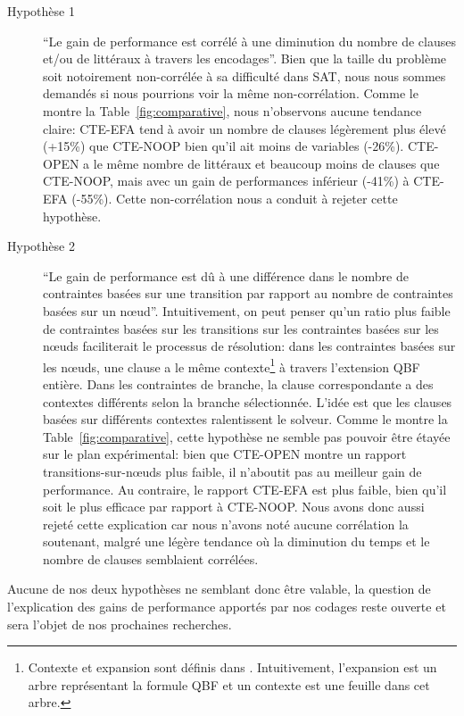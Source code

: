 \begin{description}
\item[Hypothèse 1] ``Le gain de performance est corrélé à une diminution du nombre de clauses et/ou de littéraux à travers les encodages''. Bien que la taille du problème soit notoirement non-corrélée à sa difficulté dans SAT, nous nous sommes demandés si nous pourrions voir la même non-corrélation. Comme le montre la Table~\ref{fig:comparative}, nous n'observons aucune tendance claire: CTE-EFA tend à avoir un nombre de clauses légèrement plus élevé (+15\%) que CTE-NOOP bien qu'il ait moins de variables (-26\%). CTE-OPEN a le même nombre de littéraux et beaucoup moins de clauses que CTE-NOOP, mais avec un gain de performances inférieur (-41\%) à CTE-EFA (-55\%). Cette non-corrélation nous a conduit à rejeter cette hypothèse.
~\\

\item[Hypothèse 2] ``Le gain de performance est dû à une différence dans le nombre de contraintes basées sur une transition par rapport au nombre de contraintes basées sur un n\oe ud''. Intuitivement, on peut penser qu'un ratio plus faible de contraintes basées sur les transitions sur les contraintes basées sur les n\oe uds faciliterait le processus de résolution: dans les contraintes basées sur les n\oe uds, une clause a le même contexte\footnote {Contexte et expansion sont définis dans \cite{DBLP:conf/ecai/CashmoreFG12}. Intuitivement, l'expansion est un arbre représentant la formule QBF et un contexte est une feuille dans cet arbre.} à travers l'extension QBF entière. Dans les contraintes de branche, la clause correspondante a des contextes différents selon la branche sélectionnée. L'idée est que les clauses basées sur différents contextes ralentissent le solveur. Comme le montre la Table~\ref{fig:comparative}, cette hypothèse ne semble pas pouvoir être étayée sur le plan expérimental: bien que CTE-OPEN montre un rapport transitions-sur-n\oe uds plus faible, il n'aboutit pas au meilleur gain de performance. Au contraire, le rapport CTE-EFA est plus faible, bien qu'il soit le plus efficace par rapport à CTE-NOOP. Nous avons donc aussi rejeté cette explication car nous n'avons noté aucune corrélation la soutenant, malgré une légère tendance où la diminution du temps et le nombre de clauses semblaient corrélées.
\end{description}

Aucune de nos deux hypothèses ne semblant donc être valable, la question de l'explication des gains de performance apportés par nos codages reste ouverte et sera l'objet de nos prochaines recherches.


